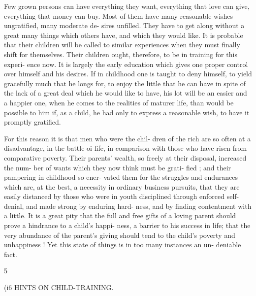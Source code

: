 \documentclass[
]{book}
\begin{document}
Few grown persons can have everything they want, everything that love can give, everything that money can buy. Most of them have many reasonable wishes ungratified, many moderate de- sires unfilled. They have to get along without a great many things which others have, and which they would like. It is probable that their children will be called to similar experiences when they must finally shift for themselves. Their children ought, therefore, to be in training for this experi- ence now. It is largely the early education which gives one proper control over himself and his desires. If in childhood one is taught to deny himself, to yield gracefully much that he longs for, to enjoy the little that he can have in spite of the lack of a great deal which he would like to have, his lot will be an easier and a happier one, when he comes to the realities of maturer life, than would be possible to him if, as a child, he had only to express a reasonable wish, to have it promptly gratified.

For this reason it is that men who were the chil- dren of the rich are so often at a disadvantage, in the battle oi life, in comparison with those who have risen from comparative poverty. Their parents' wealth, so freely at their disposal, increased the num- ber of wants which they now think must be grati- fied ; and their pampering in childhood so ener- vated them for the struggles and endurances which are, at the best, a necessity in ordinary business pursuits, that they are easily distanced by those who were in youth disciplined through enforced self-denial, and made strong by enduring hard- ness, and by finding contentment with a little. It is a great pity that the full and free gifts of a loving parent should prove a hindrance to a child's happi- ness, a barrier to his success in life; that the very abundance of the parent's giving should tend to the child's poverty and unhappiness ! Yet this state of things is in too many instances an un- deniable fact.

5

(i6 HINTS ON CHILD-TRAINING.
\end{document}
